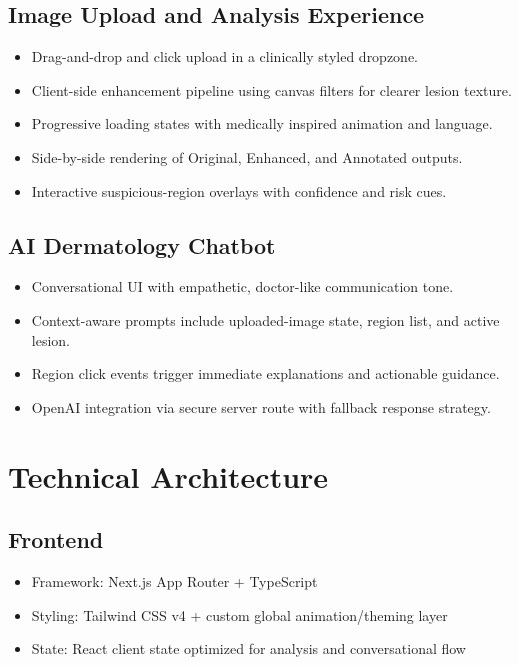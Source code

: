 \documentclass[12pt,a4paper]{article}
\begin{document}
\subsection{Image Upload and Analysis Experience}
\begin{itemize}[leftmargin=1.5em]
    \item Drag-and-drop and click upload in a clinically styled dropzone.
    \item Client-side enhancement pipeline using canvas filters for clearer lesion texture.
    \item Progressive loading states with medically inspired animation and language.
    \item Side-by-side rendering of Original, Enhanced, and Annotated outputs.
    \item Interactive suspicious-region overlays with confidence and risk cues.
\end{itemize}

\subsection{AI Dermatology Chatbot}
\begin{itemize}[leftmargin=1.5em]
    \item Conversational UI with empathetic, doctor-like communication tone.
    \item Context-aware prompts include uploaded-image state, region list, and active lesion.
    \item Region click events trigger immediate explanations and actionable guidance.
    \item OpenAI integration via secure server route with fallback response strategy.
\end{itemize}

\section{Technical Architecture}
\subsection{Frontend}
\begin{itemize}[leftmargin=1.5em]
    \item Framework: Next.js App Router + TypeScript
    \item Styling: Tailwind CSS v4 + custom global animation/theming layer
    \item State: React client state optimized for analysis and conversational flow
\end{itemize}
\end{document}
